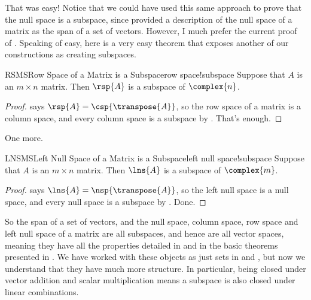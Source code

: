 %
That was easy!  Notice that we could have used this same approach to prove that the null space is a subspace, since  provided a description of the null space of a matrix as the span of a set of vectors.  However, I much prefer the current proof of .  Speaking of easy, here is a very easy theorem that exposes another of our constructions as creating subspaces.\par
%
\begin{theorem}{RSMS}{Row Space of a Matrix is a Subspace}{row space!subspace}
Suppose that $A$ is an $m\times n$ matrix.  Then $\rsp{A}$ is a subspace of $\complex{n}$.
\end{theorem}
%
\begin{proof}
 says $\rsp{A}=\csp{\transpose{A}}$, so the row space of a matrix is a column space, and every column space is a subspace by .  That's enough.
\end{proof}
%
One more.
%
\begin{theorem}{LNSMS}{Left Null Space of a Matrix is a Subspace}{left null space!subspace}
Suppose that $A$ is an $m\times n$ matrix.  Then $\lns{A}$ is a subspace of $\complex{m}$.
\end{theorem}
%
\begin{proof}
 says $\lns{A}=\nsp{\transpose{A}}$, so the left null space is a null space, and every null space is a subspace by .  Done.
\end{proof}
%
So the span of a set of vectors, and the null space, column space, row space and left null space of a matrix are all subspaces, and hence are all vector spaces, meaning they have all the properties detailed in  and in the basic theorems presented in .  We have worked with these objects as just sets in  and , but now we understand that they have much more structure.  In particular, being closed under vector addition and scalar multiplication means a subspace is also closed under linear combinations.
%
%

